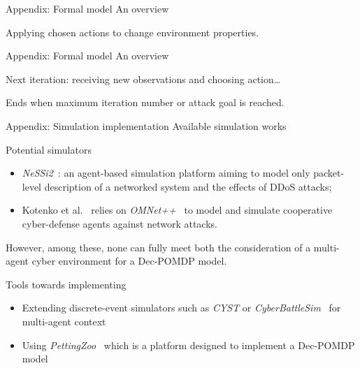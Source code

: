 \begin{frame}{Appendix: Formal model}
    {An overview}

    Applying chosen actions to change environment properties.

    \begin{figure}
        \centering
        
    \end{figure}

\end{frame}

\begin{frame}{Appendix: Formal model}
    {An overview}

    Next iteration: receiving new observations and choosing action\dots

    \begin{figure}
        \centering
        
    \end{figure}

    \vspace{-0.1cm}

    Ends when maximum iteration number or attack goal is reached.

\end{frame}

\begin{frame}{Appendix: Simulation implementation}
    {Available simulation works}

    \begin{block}{Potential  simulators}
        \begin{itemize}
            \item \textit{NeSSi2}~\cite{DGrunewald2011}: an agent-based simulation platform aiming to model only packet-level description of a networked system and the effects of DDoS attacks;
            \item Kotenko et al.~\cite{IKotenko2007} relies on \textit{OMNet++}~\cite{Varga2010} to model and simulate cooperative cyber-defense agents against network attacks.
        \end{itemize}
    \end{block}

    However, among these, none can fully meet both the consideration of a multi-agent cyber environment for a Dec-POMDP model.

    \begin{block}{Tools towards implementing}
        \begin{itemize}
            \item Extending discrete-event simulators such as \textit{CYST}\cite{drasar_session-level_2020} or \textit{CyberBattleSim}~\cite{cyberbattlesim} for multi-agent context
            \item Using \textit{PettingZoo}~\cite{jk2020} which is a platform designed to implement a Dec-POMDP model
        \end{itemize}
    \end{block}

\end{frame}


